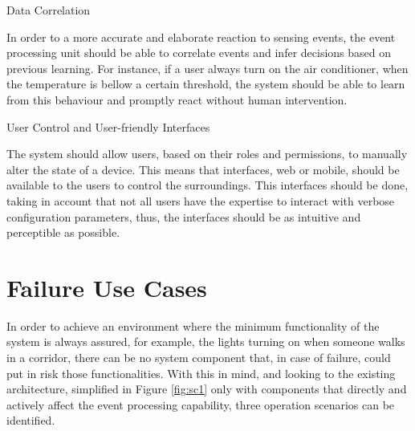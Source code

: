 \begin{Paragraph}{Data Correlation}

In order to a more accurate and elaborate reaction to sensing events, the event processing unit should be able to correlate events and infer decisions based on previous learning. For instance, if a user always turn on the air conditioner, when the temperature is bellow a certain threshold, the system should be able to learn from this behaviour and promptly react without human intervention.

\end{Paragraph}

\begin{Paragraph}{User Control and User-friendly Interfaces}
	
The system should allow users, based on their roles and permissions, to manually alter the state of a device. This means that interfaces, web or mobile, should be available to the users to control the surroundings. This interfaces should be done, taking in account that not all users have the expertise to interact with verbose configuration parameters, thus, the interfaces should be as intuitive and perceptible as possible.
	
\end{Paragraph}




\section{Failure Use Cases}
\label{Architecture:usecases}

In order to achieve an environment where the minimum functionality of the system is always assured, for example, the lights turning on when someone walks in a corridor, there can be no system component that, in case of failure, could put in risk those functionalities. With this in mind, and looking to the existing architecture, simplified in Figure \ref{fig:sc1} only with components that directly and actively affect the event processing capability, three operation scenarios can be identified. 


